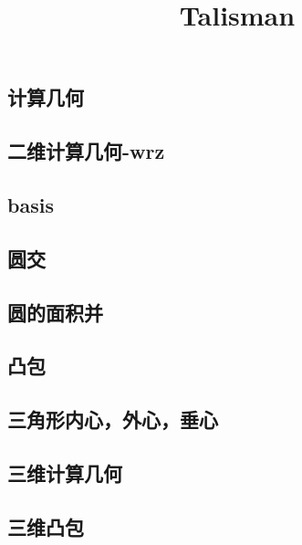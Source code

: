 \documentclass[titlepage,a4paper,10pt]{article}
\title{Talisman}
\begin{document}
	\maketitle
	\begin{multicols}{2}
		\setcounter{tocdepth}{3}
		\begingroup
		\let\cleardoublepage\relax
		\let\clearpage\relax
		\renewcommand{\contentsname}{目录}
		\tableofcontents
		\newpage
		\begin{spacing}{0.8}
		\footnotesize
		\section{计算几何}
			\subsection{二维计算几何-wrz}
				
			\subsection{basis}
				
			\subsection{圆交}
				
			\subsection{圆的面积并}
				
			\subsection{凸包}
				
			\subsection{三角形内心，外心，垂心}
				
			\subsection{三维计算几何}
				
			\subsection{三维凸包}
				

\end{spacing}
\end{multicols}
\end{document}
